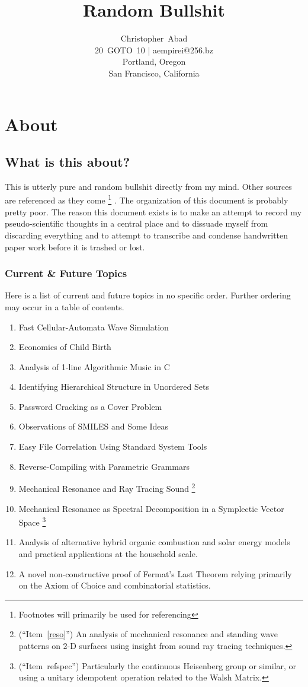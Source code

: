 \documentclass[11pt]{book}
\title{Random Bullshit}
\author{Christopher~Abad \\
20~GOTO~10 | aempirei@256.bz \\
Portland, Oregon \\
San Francisco, California }
\begin{document}
\maketitle

\chapter{About}

\section{What is this about?}

This is utterly pure and random bullshit directly from my mind. Other sources are referenced as they come%
\footnote{Footnotes will primarily be used for referencing}
.  The organization of this document is probably pretty poor. The reason this document exists is to make an attempt to record my pseudo-scientific thoughts in a central place and to dissuade myself from discarding everything and to attempt to transcribe and condense handwritten paper work before it is trashed or lost.

\subsection{Current \& Future Topics}

Here is a list of current and future topics in no specific order. Further ordering may occur in a table of contents.

\begin{enumerate}
\item Fast Cellular-Automata Wave Simulation
\item Economics of Child Birth
\item Analysis of 1-line Algorithmic Music in C
\item Identifying Hierarchical Structure in Unordered Sets
\item Password Cracking as a Cover Problem
\item Observations of SMILES and Some Ideas
\item Easy File Correlation Using Standard System Tools
\item Reverse-Compiling with Parametric Grammars
\item\label{reso} Mechanical Resonance and Ray Tracing Sound%
\footnote{(``Item~\ref{reso}'') An analysis of mechanical resonance and standing wave patterns on 2-D surfaces using insight from sound ray tracing techniques.}
\item\label{spec} Mechanical Resonance as Spectral Decomposition in a Symplectic Vector Space%
\footnote{(``Item~ref{spec}'') Particularly the continuous Heisenberg group or similar, or using a unitary idempotent operation related to the Walsh Matrix.}
\item Analysis of alternative hybrid organic combustion and solar energy models and practical applications at the household scale.
\item A novel non-constructive proof of Fermat's Last Theorem relying primarily on the Axiom of Choice and combinatorial statistics.

\end{enumerate}
\end{document}

